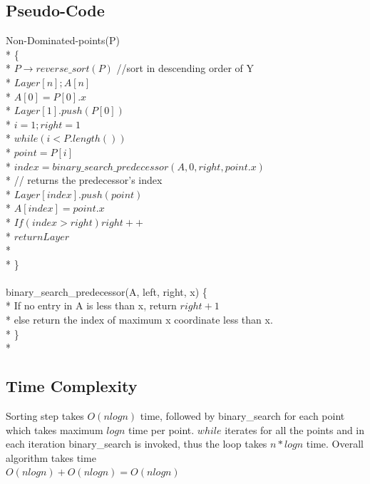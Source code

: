 \documentclass{article}
\begin{document}
\subsection{Pseudo-Code}
Non-Dominated-points(P)	\\*
\{			\\*
    \hspace*{1cm}$ P  \longrightarrow  reverse\_sort(P)$ //sort in descending order of Y  \\*
    \hspace*{1cm} $ Layer[n]; A[n] $\\*
    \hspace*{1cm} $ A[0]=P[0].x $\\*
    \hspace*{1cm} $Layer[1].push(P[0])$ \\*
	\hspace*{1cm} $i=1; right=1 $\\*
    \hspace*{1cm} $while(i < P.length())$\\*
    \hspace*{2cm} $point = P[i]$\\*
    \hspace*{2cm} $index = binary\_search\_predecessor(A, 0, right, point.x)$ \\*
    \hspace*{4cm}                // returns the predecessor's index \\*
    \hspace*{2cm} $Layer[index].push(point)$\\*
    \hspace*{2cm} $A[index] = point.x$\\*
    \hspace*{2cm} $If (index > right ) right++ $\\*
	\hspace*{1cm} $return  Layer $\\*
	\\*
\} \\
\\
binary\_search\_predecessor(A, left, right, x)
\{ \\*
\hspace*{1cm} If no entry in A is less than x, return $right+1$ \\*
			 else return the index of maximum x coordinate less than x. \\*
\} \\*

\subsection{Time Complexity}
  Sorting step takes $O(nlogn)$ time, followed by binary\_search for each point which takes maximum $ logn $ time per point.
  $while$ iterates for all the points and in each iteration binary\_search is invoked, thus the loop takes $ n*logn $ time.
  Overall algorithm takes time \\
             $O(nlogn) + O(nlogn) = O(nlogn) $
\end{document}

